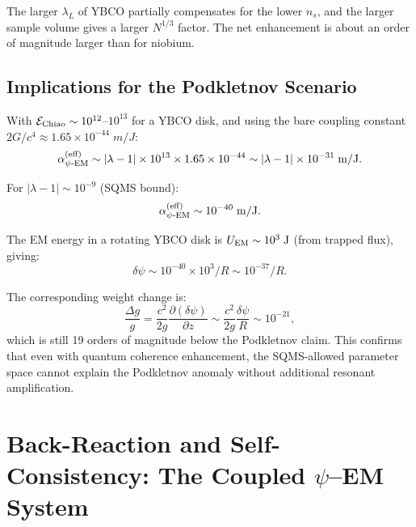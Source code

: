 \documentclass[aps,prd,twocolumn,superscriptaddress,floatfix,nofootinbib]{revtex4-2}
\newcommand{\lam}{\lambda}
\begin{document}
The larger $\lambda_L$ of YBCO partially compensates for the lower
$n_s$, and the larger sample volume gives a larger $N^{1/3}$
factor. The net enhancement is about an order of magnitude larger
than for niobium.

\subsection{Implications for the Podkletnov Scenario}
\label{sec:podkletnov-implications}

With $\mathcal{E}_{\rm Chiao} \sim 10^{12}$--$10^{13}$ for a
YBCO disk, and using the bare coupling constant
$2G/c^4 \approx 1.65 \times 10^{-44}\;\si{m/J}$:
\begin{equation}
\alpha_{\psi\text{-EM}}^{(\rm eff)}
\sim |\lam - 1| \times 10^{13} \times 1.65 \times 10^{-44}
\sim |\lam - 1| \times 10^{-31}\;\si{m/J}.
\end{equation}

For $|\lam - 1| \sim 10^{-9}$ (SQMS bound):
\begin{equation}
\alpha_{\psi\text{-EM}}^{(\rm eff)}
\sim 10^{-40}\;\si{m/J}.
\end{equation}

The EM energy in a rotating YBCO disk is $U_{\rm EM} \sim 10^3\;\si{J}$
(from trapped flux), giving:
\begin{equation}
\delta\psi \sim 10^{-40} \times 10^3/R
\sim 10^{-37}/R.
\end{equation}

The corresponding weight change is:
\begin{equation}
\frac{\Delta g}{g} = \frac{c^2}{2g}\frac{\partial(\delta\psi)}
{\partial z} \sim \frac{c^2}{2g}\frac{\delta\psi}{R}
\sim 10^{-21},
\end{equation}
which is still 19 orders of magnitude below the Podkletnov claim.
This confirms that even with quantum coherence enhancement,
the SQMS-allowed parameter space cannot explain the Podkletnov
anomaly without additional resonant amplification.


\section{Back-Reaction and Self-Consistency: The Coupled
$\psi$--EM System}\label{sec:backreaction}
\end{document}
